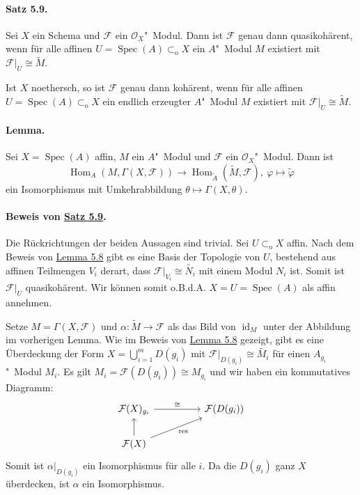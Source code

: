 \documentclass[11pt,b5paper,openany]{memoir}
\begin{document}
\paragraph{Satz 5.9.}\label{5.9} Sei $X$ ein Schema und $\mathcal{F}$ ein $\mathcal{O}_X$"~Modul. Dann ist $\mathcal{F}$ genau dann quasikohärent, wenn für alle affinen $U=\operatorname{Spec}(A)\subset_\text{o}X$ ein $A$"~Modul $M$ existiert mit $\mathcal{F}|_U\cong\widetilde{M}$.

Ist $X$ noethersch, so ist $\mathcal{F}$ genau dann kohärent, wenn für alle affinen $U=\operatorname{Spec}(A)\subset_\text{o}X$ ein endlich erzeugter $A$"~Modul $M$ existiert mit $\mathcal{F}|_U\cong\widetilde{M}$.

\paragraph{Lemma.} Sei $X=\operatorname{Spec}(A)$ affin, $M$ ein $A$"~Modul und $\mathcal{F}$ ein $\mathcal{O}_X$"~Modul. Dann ist
\[\operatorname{Hom}_A(M,\Gamma(X,\mathcal{F}))\to\operatorname{Hom}_{\widetilde{A}}(\widetilde{M},\mathcal{F}),\ \varphi\mapsto\widetilde{\varphi} \]
ein Isomorphismus mit Umkehrabbildung $\theta\mapsto\Gamma(X,\theta)$.

\paragraph{Beweis von \hyperref[5.9]{Satz 5.9}.} Die Rückrichtungen der beiden Aussagen sind trivial. Sei $U\subset_\text{o}X$ affin. Nach dem Beweis von \hyperref[5.8]{Lemma 5.8} gibt es eine Basis der Topologie von $U$, bestehend aus affinen Teilmengen $V_i$ derart, dass $\mathcal{F}|_{V_i}\cong\widetilde{N_i}$ mit einem Modul $N_i$ ist. Somit ist $\mathcal{F}|_U$ quasikohärent. Wir können somit o.B.d.A. $X=U=\operatorname{Spec}(A)$ als affin annehmen.

Setze $M=\Gamma(X,\mathcal{F})$ und $\alpha:\widetilde{M}\to\mathcal{F}$ als das Bild von $\operatorname{id}_M$ unter der Abbildung im vorherigen Lemma. Wie im Beweis von \hyperref[5.8]{Lemma 5.8} gezeigt, gibt es eine Überdeckung der Form $X=\bigcup_{i=1}^mD(g_i)$ mit $\mathcal{F}|_{D(g_i)}\cong\widetilde{M_i}$ für einen $A_{g_i}$"~Modul $M_i$. Es gilt $M_i=\mathcal{F}(D(g_i))\cong M_{g_i}$ und wir haben ein kommutatives Diagramm:
\[\begin{tikzcd}
\mathcal{F}(X)_{g_i}\ar[rr, "\cong"] && \mathcal{F}(D(g_i))\\
\mathcal{F}(X)\ar[u]\ar[urr, "\operatorname{res}"']
\end{tikzcd} \]
Somit ist $\alpha|_{D(g_i)}$ ein Isomorphismus für alle $i$. Da die $D(g_i)$ ganz $X$ überdecken, ist $\alpha$ ein Isomorphismus.
\end{document}
